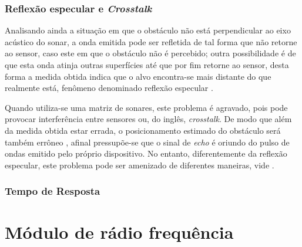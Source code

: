 \subsubsection{Reflexão especular e \textit{Crosstalk}}
Analisando ainda a situação em que o obstáculo não está perpendicular ao eixo acústico do sonar, a onda emitida pode ser refletida de tal 
forma que não retorne ao sensor, caso este em que o obstáculo não é percebido; outra possibilidade é de que esta onda atinja outras superfícies até 
que por fim retorne ao sensor, desta forma a medida obtida indica que o alvo encontra-se mais distante do que realmente está, fenômeno denominado 
reflexão especular \cite{roseli,siegwart,everett}.  

Quando utiliza-se uma matriz de sonares, este problema é agravado, pois pode provocar interferência entre sensores ou, do inglês, \textit{crosstalk}.
De modo que além da medida obtida estar errada, o posicionamento estimado do obstáculo será também errôneo \cite{murphy}, afinal pressupõe-se que o 
sinal de \textit{echo} é oriundo do pulso de ondas emitido pelo próprio dispositivo.
No entanto, diferentemente da reflexão especular, este problema pode ser amenizado de diferentes maneiras, vide \cite{2016_artigo_1,2016_artigo_5}.

\subsubsection{Tempo de Resposta} %


\section{Módulo de rádio frequência}

